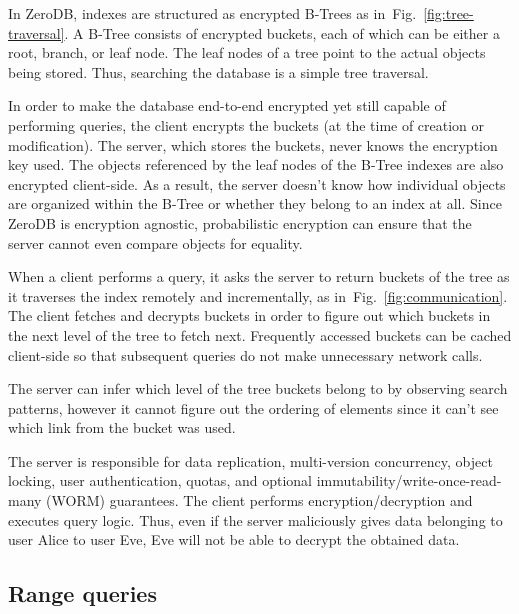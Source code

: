 \documentclass[notitlepage,longbibliography]{revtex4-1}
\newcommand{\figref}[1]{Fig.~\ref{#1}}
\begin{document}
In ZeroDB, indexes are structured as encrypted B-Trees as in~\figref{fig:tree-traversal}.
A B-Tree consists of encrypted buckets, each of which can be either a root, branch, or leaf node.
The leaf nodes of a tree point to the actual objects being stored.
Thus, searching the database is a simple tree traversal.

In order to make the database end-to-end encrypted yet still capable of performing queries, the client encrypts the buckets (at the time of creation or modification).
The server, which stores the buckets, never knows the encryption key used.
The objects referenced by the leaf nodes of the B-Tree indexes are also encrypted client-side.
As a result, the server doesn't know how individual objects are organized within the B-Tree or whether they belong to an index at all.
Since ZeroDB is encryption agnostic, probabilistic encryption can ensure that the server cannot even compare objects for equality.

When a client performs a query, it asks the server to return buckets of the tree as it traverses the index remotely and incrementally, as in~\figref{fig:communication}.
The client fetches and decrypts buckets in order to figure out which buckets in the next level of the tree to fetch next.
Frequently accessed buckets can be cached client-side so that subsequent queries do not make unnecessary network calls.

The server can infer which level of the tree buckets belong to by observing search patterns,
however it cannot figure out the ordering of elements since it can't see which link from the bucket was used.

The server is responsible for data replication, multi-version concurrency, object locking, user authentication, quotas, and optional immutability/write-once-read-many (WORM) guarantees.
The client performs encryption/decryption and executes query logic.
Thus, even if the server maliciously gives data belonging to user Alice to user Eve,
Eve will not be able to decrypt the obtained data.

\subsection{Range queries}
\end{document}
